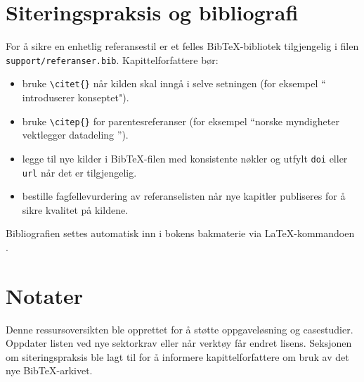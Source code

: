 \section{Siteringspraksis og bibliografi}
For å sikre en enhetlig referansestil er et felles Bib\TeX-bibliotek tilgjengelig i filen \texttt{support/referanser.bib}. Kapittelforfattere bør:
\begin{itemize}
    \item bruke \verb+\citet{}+ når kilden skal inngå i selve setningen (for eksempel ``\citet{grieves2017digital} introduserer konseptet").
    \item bruke \verb+\citep{}+ for parentesreferanser (for eksempel ``norske myndigheter vektlegger datadeling \citep{regjeringen2022datastrategi}'').
    \item legge til nye kilder i Bib\TeX-filen med konsistente nøkler og utfylt \texttt{doi} eller \texttt{url} når det er tilgjengelig.
    \item bestille fagfellevurdering av referanselisten når nye kapitler publiseres for å sikre kvalitet på kildene.
\end{itemize}

Bibliografien settes automatisk inn i bokens bakmaterie via \LaTeX-kommandoen \verb++.

\section{Notater}
Denne ressursoversikten ble opprettet for å støtte oppgaveløsning og casestudier. Oppdater listen ved nye sektorkrav eller når verktøy får endret lisens. Seksjonen om siteringspraksis ble lagt til for å informere kapittelforfattere om bruk av det nye Bib\TeX-arkivet.

